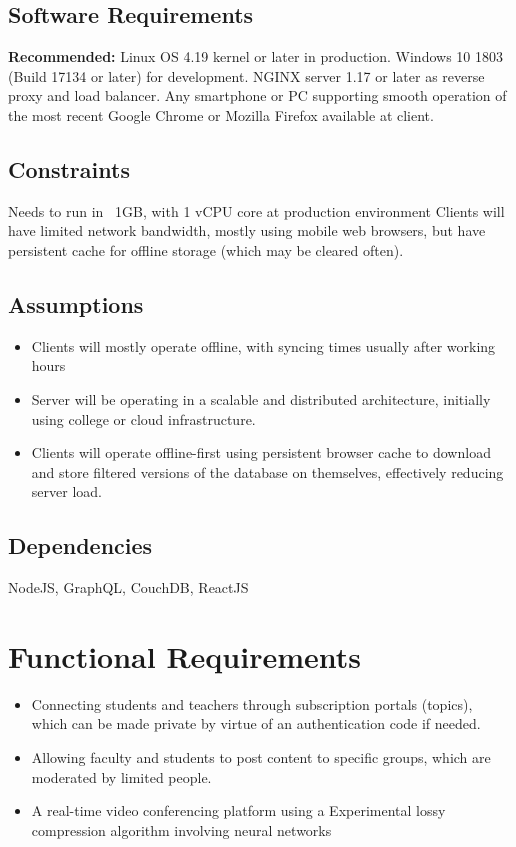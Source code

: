 \subsection{Software Requirements}

\textbf{Recommended:} 
Linux OS 4.19 kernel or later in production.
Windows 10 1803 (Build 17134 or later) for development.
NGINX server 1.17 or later as reverse proxy and load balancer.
Any smartphone or PC supporting smooth operation of the most recent 
Google Chrome or Mozilla Firefox available at client.

\subsection{Constraints}

Needs to run in ~1GB, with 1 vCPU core at production environment
Clients will have limited network bandwidth, mostly using mobile web browsers, but 
have persistent cache for offline storage (which may be cleared often).

\subsection{Assumptions}

\begin{itemize}
    \item Clients will mostly operate offline, with syncing times usually after working hours
    \item Server will be operating in a scalable and distributed architecture, initially using college or cloud infrastructure.
    \item Clients will operate offline-first using persistent browser cache to download and store filtered versions of the database on themselves, effectively reducing server load.
\end{itemize}

\subsection{Dependencies}

NodeJS, GraphQL, CouchDB, ReactJS

\section{Functional Requirements}

\begin{itemize}
    \item Connecting students and teachers through subscription portals (topics), which can be made private by virtue of an authentication code if needed.
    \item Allowing faculty and students to post content to specific groups, which are moderated by limited people.
    \item A real-time video conferencing platform using a Experimental lossy compression algorithm involving neural networks
\end{itemize}

